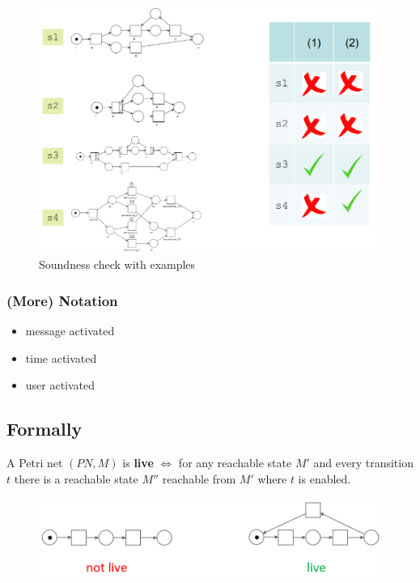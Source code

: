 \begin{figure}[htbp]
   \centering
   \includegraphics{images/wfnet_sound.png}
   \caption{Soundness check with examples}
   \label{fig:wfnet_sound}
\end{figure}

\subsubsection*{(More) Notation}
\begin{itemize}
   \item \Letter{} message activated
   \item \VarClock{} time activated
   \item \APLdownarrowbox{} user activated
\end{itemize}

\subsection{Formally}
A Petri net $(PN,M)$ is \textbf{live} $\Longleftrightarrow$ for any reachable state $M'$ and every transition $t$ there is a reachable state $M''$ reachable from $M'$ where $t$ is enabled.

\begin{figure}[htbp]
   \centering
   \includegraphics{images/wfnet_liveness.png}
   \label{fig:wfnet_liveness}
\end{figure}

